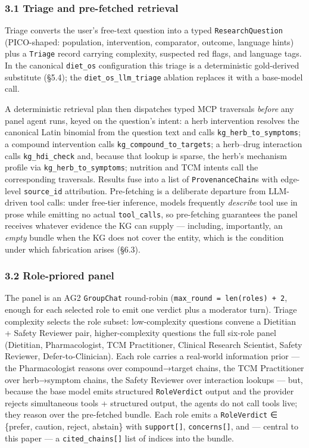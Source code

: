 \documentclass[
]{article}
\begin{document}
\hypertarget{triage-and-pre-fetched-retrieval}{%
\subsubsection{3.1 Triage and pre-fetched
retrieval}\label{triage-and-pre-fetched-retrieval}}

Triage converts the user's free-text question into a typed
\texttt{ResearchQuestion} (PICO-shaped: population, intervention,
comparator, outcome, language hints) plus a \texttt{Triage} record
carrying complexity, suspected red flags, and language tags. In the
canonical \texttt{diet\_os} configuration this triage is a deterministic
gold-derived substitute (§5.4); the \texttt{diet\_os\_llm\_triage}
ablation replaces it with a base-model call.

A deterministic retrieval plan then dispatches typed MCP traversals
\emph{before} any panel agent runs, keyed on the question's intent: a
herb intervention resolves the canonical Latin binomial from the
question text and calls \texttt{kg\_herb\_to\_symptoms}; a compound
intervention calls \texttt{kg\_compound\_to\_targets}; a herb--drug
interaction calls \texttt{kg\_hdi\_check} and, because that lookup is
sparse, the herb's mechanism profile via
\texttt{kg\_herb\_to\_symptoms}; nutrition and TCM intents call the
corresponding traversals. Results fuse into a list of
\texttt{ProvenanceChain}s with edge-level \texttt{source\_id}
attribution. Pre-fetching is a deliberate departure from LLM-driven tool
calls: under free-tier inference, models frequently \emph{describe} tool
use in prose while emitting no actual \texttt{tool\_calls}, so
pre-fetching guarantees the panel receives whatever evidence the KG can
supply --- including, importantly, an \emph{empty} bundle when the KG
does not cover the entity, which is the condition under which
fabrication arises (§6.3).

\hypertarget{role-priored-panel}{%
\subsubsection{3.2 Role-priored panel}\label{role-priored-panel}}

The panel is an AG2 \texttt{GroupChat} round-robin
(\texttt{max\_round\ =\ len(roles)\ +\ 2}, enough for each selected role
to emit one verdict plus a moderator turn). Triage complexity selects
the role subset: low-complexity questions convene a Dietitian + Safety
Reviewer pair, higher-complexity questions the full six-role panel
(Dietitian, Pharmacologist, TCM Practitioner, Clinical Research
Scientist, Safety Reviewer, Defer-to-Clinician). Each role carries a
real-world information prior --- the Pharmacologist reasons over
compound→target chains, the TCM Practitioner over herb→symptom chains,
the Safety Reviewer over interaction lookups --- but, because the base
model emits structured \texttt{RoleVerdict} output and the provider
rejects simultaneous tools + structured output, the agents do not call
tools live; they reason over the pre-fetched bundle. Each role emits a
\texttt{RoleVerdict} ∈ \{prefer, caution, reject, abstain\} with
\texttt{support{[}{]}}, \texttt{concerns{[}{]}}, and --- central to this
paper --- a \texttt{cited\_chains{[}{]}} list of indices into the
bundle.
\end{document}
